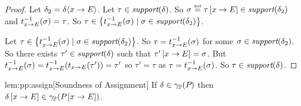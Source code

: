 \begin{proof} Let $ \delta_2 = \delta \langle x \rightarrow E \rangle $. Let $ \tau \in \textit{support}(\delta) $. So
$ \sigma \stackrel{\smash{\scriptscriptstyle \mathrm{def}}}= \tau \left[ x \rightarrow E \right] \in \textit{support}(\delta_2) $ and
$ t_{x \rightarrow E}^{-1}(\sigma) = \tau $. So
$ \tau \in \left\{ t_{x \rightarrow E}^{-1}(\sigma) \;|\; \sigma \in
\textit{support}(\delta_2) \right\} $.

Let
$ \tau \in \left\{ t_{x \rightarrow E}^{-1}(\sigma) \;|\; \sigma \in \textit{support}(\delta_2) \right\}
$. So $ \tau = t_{x \rightarrow E}^{-1}(\sigma) $ for some
$ \sigma \in \textit{support}(\delta_2) $. So there exists $ \tau' \in
\textit{support}(\delta) $ such that $ \tau' \left[ x \rightarrow E \right] = \sigma $. But
$ t_{x \rightarrow E}^{-1}(\sigma)
= t_{x \rightarrow E}^{-1}(t_{x \rightarrow E}(\tau')) = \tau' $ so $ \tau'
= \tau $ as $ \tau = t_{x \rightarrow E}^{-1}(\sigma) $. So $ \tau \in
\textit{support}(\delta) $.
\end{proof}

\begin{replemma}{lem:pp:assign}[Soundness of Assignment]
If $\delta \in \gamma_{\mathbb{P}}(P_{})$ then $\delta \left[ x \rightarrow E \right] \in \gamma_{\mathbb{P}}(P_{} \left[ x \rightarrow E \right])$.
\end{replemma}

